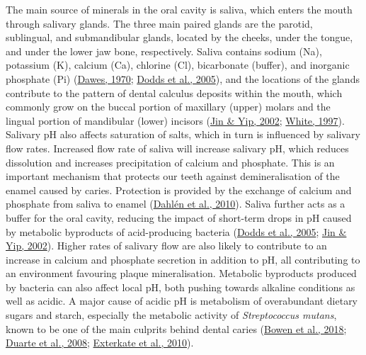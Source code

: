 \documentclass[
  b5paper,
]{book}
\begin{document}
The main source of minerals in the oral cavity is saliva, which enters
the mouth through salivary glands. The three main paired glands are the
parotid, sublingual, and submandibular glands, located by the cheeks,
under the tongue, and under the lower jaw bone, respectively. Saliva
contains sodium (Na), potassium (K), calcium (Ca), chlorine (Cl),
bicarbonate (buffer), and inorganic phosphate (Pi)
(\protect\hyperlink{ref-dawesEffectsDiet1970}{Dawes, 1970};
\protect\hyperlink{ref-doddsHealthBenefits2005}{Dodds et al., 2005}),
and the locations of the glands contribute to the pattern of dental
calculus deposits within the mouth, which commonly grow on the buccal
portion of maxillary (upper) molars and the lingual portion of
mandibular (lower) incisors
(\protect\hyperlink{ref-jinSupragingivalCalculus2002}{Jin \& Yip, 2002};
\protect\hyperlink{ref-whiteDentalCalculus1997}{White, 1997}). Salivary
pH also affects saturation of salts, which in turn is influenced by
salivary flow rates. Increased flow rate of saliva will increase
salivary pH, which reduces dissolution and increases precipitation of
calcium and phosphate. This is an important mechanism that protects our
teeth against demineralisation of the enamel caused by caries.
Protection is provided by the exchange of calcium and phosphate from
saliva to enamel
(\protect\hyperlink{ref-dahlenMicrobiologicalStudy2010}{Dahlén et al.,
2010}). Saliva further acts as a buffer for the oral cavity, reducing
the impact of short-term drops in pH caused by metabolic byproducts of
acid-producing bacteria
(\protect\hyperlink{ref-doddsHealthBenefits2005}{Dodds et al., 2005};
\protect\hyperlink{ref-jinSupragingivalCalculus2002}{Jin \& Yip, 2002}).
Higher rates of salivary flow are also likely to contribute to an
increase in calcium and phosphate secretion in addition to pH, all
contributing to an environment favouring plaque mineralisation.
Metabolic byproducts produced by bacteria can also affect local pH, both
pushing towards alkaline conditions as well as acidic. A major cause of
acidic pH is metabolism of overabundant dietary sugars and starch,
especially the metabolic activity of \emph{Streptococcus mutans}, known
to be one of the main culprits behind dental caries
(\protect\hyperlink{ref-bowenOralBiofilms2018}{Bowen et al., 2018};
\protect\hyperlink{ref-duarteInfluencesStarch2008}{Duarte et al., 2008};
\protect\hyperlink{ref-extercateAAA2010}{Exterkate et al., 2010}).
\end{document}
